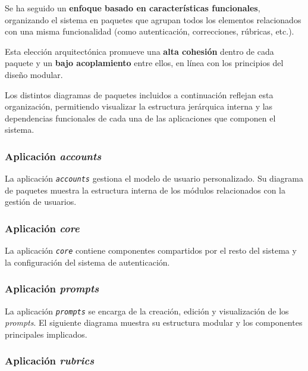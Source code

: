 Se ha seguido un \textbf{enfoque basado en características funcionales}, organizando el sistema en paquetes que agrupan todos los elementos relacionados con una misma funcionalidad (como autenticación, correcciones, rúbricas, etc.).

Esta elección arquitectónica promueve una \textbf{alta cohesión} dentro de cada paquete y un \textbf{bajo acoplamiento} entre ellos, en línea con los principios del diseño modular.

Los distintos diagramas de paquetes incluidos a continuación reflejan esta organización, permitiendo visualizar la estructura jerárquica interna y las dependencias funcionales de cada una de las aplicaciones que componen el sistema.

\subsubsection{Aplicación \textit{accounts}}

La aplicación \texttt{\textit{accounts}} gestiona el modelo de usuario personalizado. Su diagrama de paquetes muestra la estructura interna de los módulos relacionados con la gestión de usuarios.


\subsubsection{Aplicación \textit{core}}

La aplicación \texttt{\textit{core}} contiene componentes compartidos por el resto del sistema y la configuración del sistema de autenticación.


\subsubsection{Aplicación \textit{prompts}}

La aplicación \texttt{\textit{prompts}} se encarga de la creación, edición y visualización de los \textit{prompts}. El siguiente diagrama muestra su estructura modular y los componentes principales implicados.


\subsubsection{Aplicación \textit{rubrics}}

